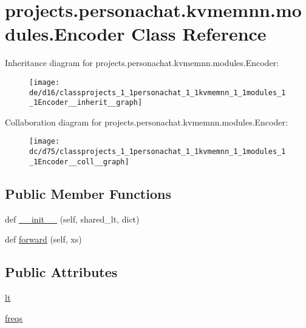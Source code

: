 \hypertarget{classprojects_1_1personachat_1_1kvmemnn_1_1modules_1_1Encoder}{}\section{projects.\+personachat.\+kvmemnn.\+modules.\+Encoder Class Reference}
\label{classprojects_1_1personachat_1_1kvmemnn_1_1modules_1_1Encoder}


Inheritance diagram for projects.\+personachat.\+kvmemnn.\+modules.\+Encoder\+:
\nopagebreak
\begin{figure}[H]
\begin{center}
\leavevmode
\texttt{[image: de/d16/classprojects\_1\_1personachat\_1\_1kvmemnn\_1\_1modules\_1\_1Encoder\_\_inherit\_\_graph]}
\end{center}
\end{figure}


Collaboration diagram for projects.\+personachat.\+kvmemnn.\+modules.\+Encoder\+:
\nopagebreak
\begin{figure}[H]
\begin{center}
\leavevmode
\texttt{[image: dc/d75/classprojects\_1\_1personachat\_1\_1kvmemnn\_1\_1modules\_1\_1Encoder\_\_coll\_\_graph]}
\end{center}
\end{figure}
\subsection*{Public Member Functions}
\begin{DoxyCompactItemize}
\item 
def \hyperlink{classprojects_1_1personachat_1_1kvmemnn_1_1modules_1_1Encoder_a9ec8df457392023bb1d823f204ca645f}{\+\_\+\+\_\+init\+\_\+\+\_\+} (self, shared\+\_\+lt, dict)
\item 
def \hyperlink{classprojects_1_1personachat_1_1kvmemnn_1_1modules_1_1Encoder_a06627a5af4545ab9baad60440ad4e9bb}{forward} (self, xs)
\end{DoxyCompactItemize}
\subsection*{Public Attributes}
\begin{DoxyCompactItemize}
\item 
\hyperlink{classprojects_1_1personachat_1_1kvmemnn_1_1modules_1_1Encoder_aaeceefba978096fa670e5b2b598a2d1c}{lt}
\item 
\hyperlink{classprojects_1_1personachat_1_1kvmemnn_1_1modules_1_1Encoder_ae221f1c7a7a3d2b946b4d9961259a6d3}{freqs}
\end{DoxyCompactItemize}


